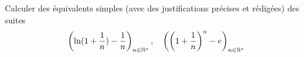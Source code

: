 Calculer des {\'e}quivalents simples (avec des justifications pr{\'e}cises
et r{\'e}dig{\'e}es) des suites
\[\left(\ln (1+\frac{1}{n})-\frac{1}{n}\right)_{n \in \Bbb{N}^*},
\quad \left(\left(1+\frac{1}{n}\right)^{n}-e\right)_{n \in
\Bbb{N}^*}\]
